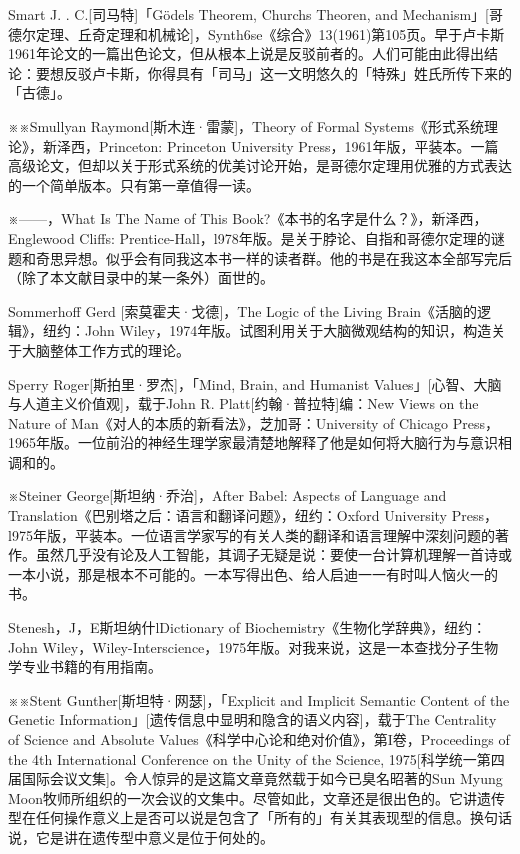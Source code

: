\documentclass[
  12pt,
  twoside,
  openright,
  oldfontcommands,
]{memoir}
\begin{document}
Smart J. . C.{[}司马特{]}「Gödel\textquotesingle s Theorem,
Church\textquotesingle s Theoren, and
Mechanism」{[}哥德尔定理、丘奇定理和机械论{]}，Synth6se《综合》13(1961)第105页。早于卢卡斯1961年论文的一篇出色论文，但从根本上说是反驳前者的。人们可能由此得出结论：要想反驳卢卡斯，你得具有「司马」这一文明悠久的「特殊」姓氏所传下来的「古德」。

※※Smullyan Raymond{[}斯木连·雷蒙{]}，Theory of Formal
Systems《形式系统理论》，新泽西，Princeton: Princeton University
Press，1961年版，平装本。一篇高级论文，但却以关于形式系统的优美讨论开始，是哥德尔定理用优雅的方式表达的一个简单版本。只有第一章值得一读。

※------，What Is The Name of This
Book?《本书的名字是什么？》，新泽西，Englewood Cliffs:
Prentice-Hall，l978年版。是关于脖论、自指和哥德尔定理的谜题和奇思异想。似乎会有同我这本书一样的读者群。他的书是在我这本全部写完后（除了本文献目录中的某一条外）面世的。

Sommerhoff Gerd {[}索莫霍夫·戈德{]}，The Logic of the Living
Brain《活脑的逻辑》，纽约：John
Wiley，1974年版。试图利用关于大脑微观结构的知识，构造关于大脑整体工作方式的理论。

Sperry Roger{[}斯拍里·罗杰{]}，「Mind, Brain, and Humanist
Values」{[}心智、大脑与人道主义价值观{]}，载于John R.
Platt{[}约翰·普拉特{]}编：New Views on the Nature of
Man《对人的本质的新看法》，芝加哥：University of Chicago
Press，1965年版。一位前沿的神经生理学家最清楚地解释了他是如何将大脑行为与意识相调和的。

※Steiner George{[}斯坦纳·乔治{]}，After Babel: Aspects of Language and
Translation《巴别塔之后：语言和翻译问题》，纽约：Oxford University
Press，l975年版，平装本。一位语言学家写的有关人类的翻译和语言理解中深刻问题的著作。虽然几乎没有论及人工智能，其调子无疑是说：要使一台计算机理解一首诗或一本小说，那是根本不可能的。一本写得出色、给人启迪一一有时叫人恼火一的书。

Stenesh，J，E斯坦纳什lDictionary of Biochemistry《生物化学辞典》，纽约：
John
Wiley，Wiley-Interscience，1975年版。对我来说，这是一本查找分子生物学专业书籍的有用指南。

※※Stent Gunther{[}斯坦特·网瑟{]}，「Explicit and Implicit Semantic
Content of the Genetic
Information」{[}遗传信息中显明和隐含的语义内容{]}，载于The Centrality of
Science and Absolute Values《科学中心论和绝对价值》，第I卷，Proceedings
of the 4th International Conference on the Unity of the Science,
1975{[}科学统一第四届国际会议文集{]}。令人惊异的是这篇文章竟然载于如今已臭名昭著的Sun
Myung
Moon牧师所组织的一次会议的文集中。尽管如此，文章还是很出色的。它讲遗传型在任何操作意义上是否可以说是包含了「所有的」有关其表现型的信息。换句话说，它是讲在遗传型中意义是位于何处的。
\end{document}
